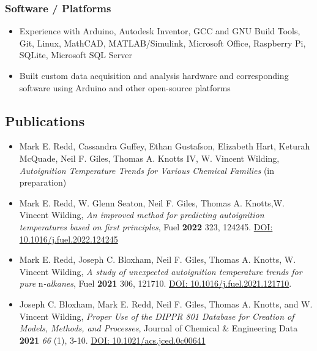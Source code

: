 \hypertarget{software-platforms}{%
\subsubsection{Software / Platforms}\label{software-platforms}}

\begin{itemize}
\tightlist
\item
  Experience with Arduino, Autodesk Inventor, GCC and GNU Build Tools,
  Git, Linux, MathCAD, MATLAB/Simulink, Microsoft Office, Raspberry Pi,
  SQLite, Microsoft SQL Server
\item
  Built custom data acquisition and analysis hardware and corresponding
  software using Arduino and other open-source platforms
\end{itemize}

\hypertarget{publications}{%
\subsection{Publications}\label{publications}}


\begin{itemize}
\item
  Mark E. Redd, Cassandra Guffey, Ethan Gustafson, Elizabeth Hart,
  Keturah McQuade, Neil F. Giles, Thomas A. Knotts IV, W. Vincent
  Wilding, \emph{Autoignition Temperature Trends for Various Chemical
  Families} (in preparation)
\item
  Mark E. Redd, W. Glenn Seaton, Neil F. Giles, Thomas A. Knotts,W.
  Vincent Wilding, \emph{An improved method for predicting autoignition
  temperatures based on first principles}, Fuel \textbf{2022} 323,
  124245. \href{https://doi.org/10.1016/j.fuel.2022.124245}{DOI:
  10.1016/j.fuel.2022.124245}
\item
  Mark E. Redd, Joseph C. Bloxham, Neil F. Giles, Thomas A. Knotts, W.
  Vincent Wilding, \emph{A study of unexpected autoignition temperature
  trends for pure} n\emph{-alkanes}, Fuel \textbf{2021} 306, 121710.
  \href{https://doi.org/10.1016/j.fuel.2021.121710}{DOI:
  10.1016/j.fuel.2021.121710}.
\item
  Joseph C. Bloxham, Mark E. Redd, Neil F. Giles, Thomas A. Knotts, and
  W. Vincent Wilding, \emph{Proper Use of the DIPPR 801 Database for
  Creation of Models, Methods, and Processes}, Journal of Chemical \&
  Engineering Data \textbf{2021} \emph{66} (1), 3-10.
  \href{https://doi.org/10.1021/acs.jced.0c00641}{DOI:
  10.1021/acs.jced.0c00641}
\end{itemize}

